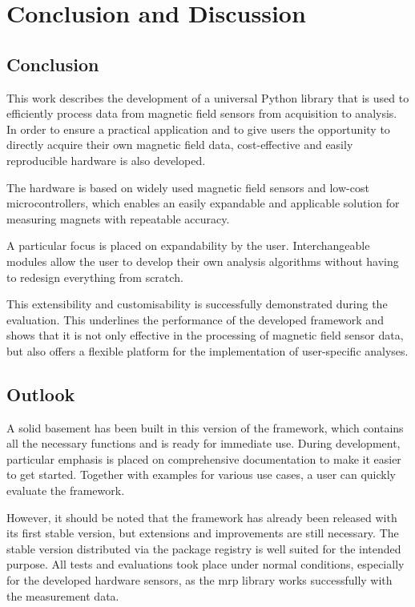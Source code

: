 \hypertarget{conclusion-and-discussion}{%
\chapter{Conclusion and Discussion}\label{conclusion-and-discussion}}

\hypertarget{conclusion}{%
\section{Conclusion}\label{conclusion}}

This work describes the development of a universal Python library that
is used to efficiently process data from magnetic field sensors from
acquisition to analysis. In order to ensure a practical application and
to give users the opportunity to directly acquire their own magnetic
field data, cost-effective and easily reproducible hardware is also
developed.

The hardware is based on widely used magnetic field sensors and low-cost
microcontrollers, which enables an easily expandable and applicable
solution for measuring magnets with repeatable accuracy.

A particular focus is placed on expandability by the user.
Interchangeable modules allow the user to develop their own analysis
algorithms without having to redesign everything from scratch.

This extensibility and customisability is successfully demonstrated
during the evaluation. This underlines the performance of the developed
framework and shows that it is not only effective in the processing of
magnetic field sensor data, but also offers a flexible platform for the
implementation of user-specific analyses.

\hypertarget{outlook}{%
\section{Outlook}\label{outlook}}

A solid basement has been built in this version of the framework, which
contains all the necessary functions and is ready for immediate use.
During development, particular emphasis is placed on comprehensive
documentation to make it easier to get started. Together with examples
for various use cases, a user can quickly evaluate the framework.

However, it should be noted that the framework has already been released
with its first stable version, but extensions and improvements are still
necessary. The stable version distributed via the package registry is
well suited for the intended purpose. All tests and evaluations took
place under normal conditions, especially for the developed hardware
sensors, as the \gls{mrp} library works successfully with the
measurement data.

